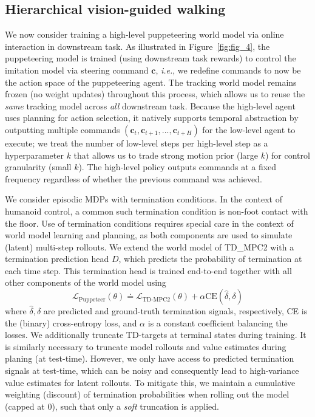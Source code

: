 \documentclass[sn-mathphys-num]{sn-jnl}%
\theoremstyle{thmstyleone}	%
\theoremstyle{thmstyletwo}	%
\theoremstyle{thmstylethree}	%
\begin{document}
\subsection{Hierarchical vision-guided walking}

We now consider training a high-level puppeteering world model via online interaction in downstream task.
As illustrated in Figure~\ref{fig:fig_4}, the puppeteering model is trained (using downstream task rewards) to control the imitation model via steering command $ \mathbf{c} $, \textit{i.e.}, we redefine commands to now be the action space of the puppeteering agent.
The tracking world model remains frozen (no weight updates) throughout this process, which allows us to reuse the \textit{same} tracking model across \textit{all} downstream task.
Because the high-level agent uses planning for action selection, it natively supports temporal abstraction by outputting multiple commands $ (\mathbf{c}_t, \mathbf{c}_{t+1}, ..., \mathbf{c}_{t+H}) $ for the low-level agent to execute; 
we treat the number of low-level steps per high-level step as a hyperparameter $ k $ that allows us to trade strong motion prior (large $ k $) for control granularity (small $ k $).
The high-level policy outputs commands at a fixed frequency regardless of whether the previous command was achieved.


We consider episodic MDPs with termination conditions.
In the context of humanoid control, a common such termination condition is non-foot contact with the floor.
Use of termination conditions requires special care in the context of world model learning and planning, as both components are used to simulate (latent) multi-step rollouts.
We extend the world model of TD\_MPC2 with a termination prediction head $ D $, which predicts the probability of termination at each time step.
This termination head is trained end-to-end together with all other components of the world model using
\begin{equation}\label{eq:trained_termination}
	\mathcal{L}_\text{Puppeteer}(\theta)
		\doteq
		\mathcal{L}_\text{TD-MPC2} (\theta) + 
		\alpha \text{CE} (\hat{\delta}, \delta)
\end{equation}
%
where $ \hat{\delta}, \delta $ are predicted and ground-truth termination signals, respectively, CE is the (binary) cross-entropy loss, and $ \alpha $ is a constant coefficient balancing the losses.
We additionally truncate TD-targets at terminal states during training.
It is similarly necessary to truncate model rollouts and value estimates during planing (at test-time).
However, we only have access to predicted termination signals at test-time, which can be noisy and consequently lead to high-variance value estimates for latent rollouts.
To mitigate this, we maintain a cumulative weighting (discount) of termination probabilities when rolling out the model (capped at 0), such that only a \textit{soft} truncation is applied.
\end{document}
